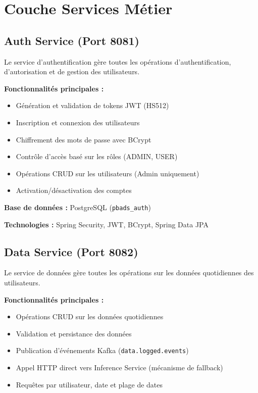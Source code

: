 \section{Couche Services Métier}

\subsection{Auth Service (Port 8081)}

Le service d'authentification gère toutes les opérations d'authentification, d'autorisation et de gestion des utilisateurs.

\textbf{Fonctionnalités principales :}
\begin{itemize}
    \item Génération et validation de tokens JWT (HS512)
    \item Inscription et connexion des utilisateurs
    \item Chiffrement des mots de passe avec BCrypt
    \item Contrôle d'accès basé sur les rôles (ADMIN, USER)
    \item Opérations CRUD sur les utilisateurs (Admin uniquement)
    \item Activation/désactivation des comptes
\end{itemize}

\textbf{Base de données :} PostgreSQL (\texttt{pbads\_auth})

\textbf{Technologies :} Spring Security, JWT, BCrypt, Spring Data JPA

\subsection{Data Service (Port 8082)}

Le service de données gère toutes les opérations sur les données quotidiennes des utilisateurs.

\textbf{Fonctionnalités principales :}
\begin{itemize}
    \item Opérations CRUD sur les données quotidiennes
    \item Validation et persistance des données
    \item Publication d'événements Kafka (\texttt{data.logged.events})
    \item Appel HTTP direct vers Inference Service (mécanisme de fallback)
    \item Requêtes par utilisateur, date et plage de dates
\end{itemize}

